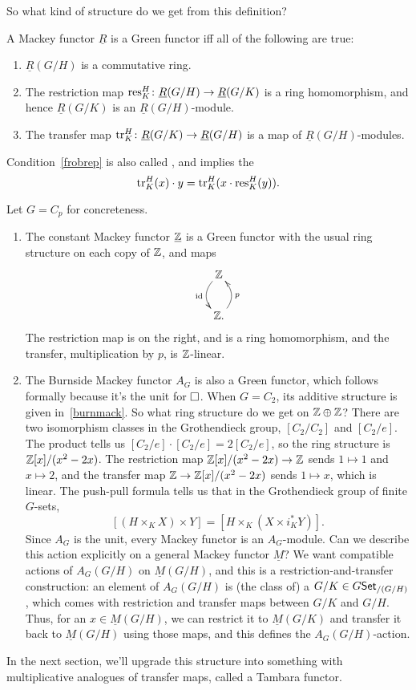 So what kind of structure do we get from this definition?
\begin{prop}
A Mackey functor $\underline R$ is a Green functor iff all of the following are true:
\begin{enumerate}
	\item $\underline R(G/H)$ is a commutative ring.
	\item The restriction map $\operatorname{res}_K^H\colon \underline R(G/H)\to \underline R(G/K)$ is a ring homomorphism, and
	hence $\underline R(G/K)$ is an $\underline R(G/H)$-module.
	\item\label{frobrep} The transfer map $\operatorname{tr}_K^H\colon \underline R(G/K)\to \underline R(G/H)$ is a map of
	$\underline R(G/H)$-modules.
\end{enumerate}
\end{prop}
Condition~\eqref{frobrep} is also called , and implies the 
\[\operatorname{tr}_K^H(x)\cdot y = \operatorname{tr}_K^H(x\cdot\operatorname{res}_K^H(y)).\]
\begin{exm}
Let $G = C_p$ for concreteness.
\begin{enumerate}
	\item The constant Mackey functor $\underline{\mathbb Z}$ is a Green functor with the usual ring structure on each copy
	of $\mathbb Z$, and maps
	\[\xymatrix{
		\Z\ar@/_0.4cm/[d]_\id\\
		\Z.\ar@/_0.4cm/[u]_p
	}\]
	The restriction map is on the right, and is a ring homomorphism, and the transfer, multiplication by $p$, is
	$\mathbb Z$-linear.
	\item The Burnside Mackey functor $A_G$ is also a Green functor, which follows formally because it's the unit
	for $\mathbin\square$. When $G = C_2$, its additive structure is given in~\eqref{burnmack}. So what ring structure do
	we get on $\mathbb Z\oplus\mathbb Z$? There are two isomorphism classes in the Grothendieck group, $[C_2/C_2]$ and $[C_2/e]$.
	The product tells us $[C_2/e]\cdot [C_2/e] = 2[C_2/e]$, so the ring structure is $\mathbb Z[x]/(x^2-2x)$. The
	restriction map $\mathbb Z[x]/(x^2-2x)\to\mathbb Z$ sends $1\mapsto 1$ and $x\mapsto 2$, and the transfer map
	$\mathbb Z\to\mathbb Z[x]/(x^2-2x)$ sends $1\mapsto x$, which is linear. The push-pull formula tells us that in the
	Grothendieck group of finite $G$-sets,
	\[[(H\times_K X)\times Y] = [H\times_K (X\times i_K^*Y)].\]
	Since $A_G$ is the unit, every Mackey functor is an $A_G$-module. Can we describe this action explicitly on a
	general Mackey functor $\underline M$? We want compatible actions of $A_G(G/H)$ on $\underline M(G/H)$, and
	this is a restriction-and-transfer construction: an element of $A_G(G/H)$ is (the class of) a $G/K\in
	G\mathsf{Set}_{/(G/H)}$, which comes with restriction and transfer maps between $G/K$ and $G/H$. Thus, for an
	$x\in\underline M(G/H)$, we can restrict it to $\underline M(G/K)$ and transfer it back to $\underline M(G/H)$
	using those maps, and this defines the $A_G(G/H)$-action.\qedhere
\end{enumerate}
\end{exm}
In the next section, we'll upgrade this structure into something with multiplicative analogues of transfer maps,
called a Tambara functor.
